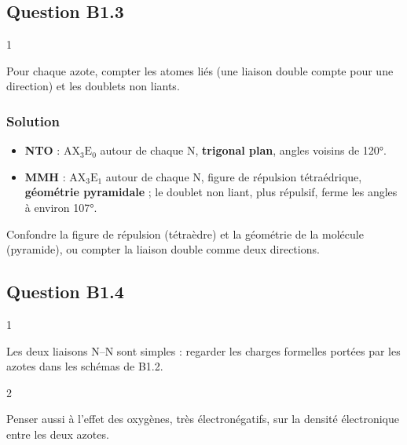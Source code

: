 \documentclass[11pt,a4paper]{article}
\providecommand{\tightlist}{\setlength{\itemsep}{0pt}\setlength{\parskip}{0pt}}
\begin{document}
\hypertarget{question-b1.3}{%
\subsection{Question B1.3}\label{question-b1.3}}

\begin{indication}{1}

Pour chaque azote, compter les atomes liés (une liaison double compte pour une direction) et les doublets non liants.

\end{indication}

\hypertarget{solution-25}{%
\subsubsection{Solution}\label{solution-25}}

\begin{itemize}
\tightlist
\item
  \textbf{NTO} : \(\mathrm{AX_3E_0}\) autour de chaque N, \textbf{trigonal plan}, angles voisins de 120°.
\item
  \textbf{MMH} : \(\mathrm{AX_3E_1}\) autour de chaque N, figure de répulsion tétraédrique, \textbf{géométrie pyramidale} ; le doublet non liant, plus répulsif, ferme les angles à environ 107°.
\end{itemize}

\begin{piege}

Confondre la figure de répulsion (tétraèdre) et la géométrie de la molécule (pyramide), ou compter la liaison double comme deux directions.

\end{piege}

\hypertarget{question-b1.4}{%
\subsection{Question B1.4}\label{question-b1.4}}

\begin{indication}{1}

Les deux liaisons N--N sont simples : regarder les charges formelles portées par les azotes dans les schémas de B1.2.

\end{indication}

\begin{indication}{2}

Penser aussi à l'effet des oxygènes, très électronégatifs, sur la densité électronique entre les deux azotes.

\end{indication}
\end{document}
